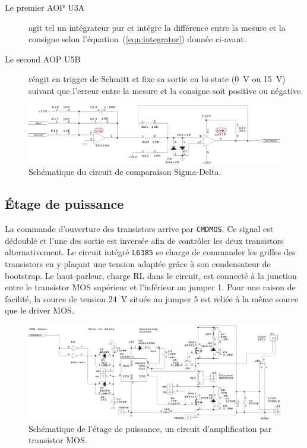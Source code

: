 \documentclass[10pt, oneside, a4paper]{article}
\begin{document}
\begin{description}
    \item[Le premier AOP U3A] agit tel un intégrateur pur et intègre la différence
        entre la mesure et la consigne selon l'équation~(\ref{eqn:integrator}) donnée
        ci-avant.
    \item[Le second AOP U5B] réagit en trigger de Schmitt et fixe sa sortie en
        bi-state (\SI{0}{\volt} ou \SI{15}{\volt}) suivant que l'erreur entre la mesure et
        la consigne soit positive ou négative.
\end{description}

\begin{figure}[!ht]
    \centering
    \includegraphics[width=\textwidth]{image/sch-ctrl.png}
    \caption{Schématique du circuit de comparaison Sigma-Delta.}
    \label{fig:sch-ctrl}
\end{figure}

\subsection{Étage de puissance}
La commande d'ouverture des transistors arrive par \texttt{CMDMOS}.
Ce signal est dédoublé et l'une des sortie est inversée afin de contrôler les deux transistors alternativement.
Le circuit intégré \texttt{L6385} se charge de commander les grilles des transistors en y plaçant une tension adaptée grâce à son condensateur de bootstrap.
Le haut-parleur, charge RL dans le circuit, est connecté à la junction entre le transistor MOS supérieur et l'inférieur au jumper 1.
Pour une raison de facilité, la source de tension \SI{24}{\volt} située au jumper 5 est reliée à la même source que le driver MOS.
\begin{figure}[!ht]
    \centering
    \includegraphics[width=\textwidth]{image/sch-mos.png}
    \caption{Schématique de l'étage de puissance, un circuit d'amplification par transistor
             MOS.}
    \label{fig:sch-mos}
\end{figure}
\end{document}
